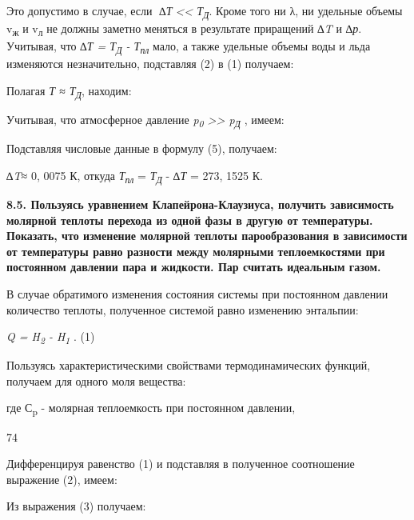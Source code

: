 Это допустимо в случае, если \emph{∆Т\textless\textless{}
Т\textsubscript{Д}}. Кроме того ни λ, ни удельные объемы
v\textsubscript{ж} и v\textsubscript{л} не должны заметно меняться в
результате приращений \emph{∆T} и \emph{∆р}. Учитывая, что \emph{∆Т =
Т\textsubscript{Д} - Т\textsubscript{пл}} мало, а также удельные объемы
воды и льда изменяются незначительно, подставляя (2) в (1) получаем:

Полагая \emph{Т ≈ Т\textsubscript{Д}}, находим:


Учитывая, что атмосферное давление \emph{p\textsubscript{0}
\textgreater\textgreater{} p\textsubscript{Д}} , имеем:


Подставляя числовые данные в формулу (5), получаем:

\emph{∆T}≈ 0, 0075 К, откуда \emph{Т\textsubscript{пл}} =
\emph{Т\textsubscript{Д}} - \emph{∆Т} = 273, 1525 К.

\textbf{8.5. Пользуясь уравнением Клапейрона-Клаузиуса, получить
зависимость молярной теплоты перехода из одной фазы в другую от
температуры. Показать, что изменение молярной теплоты парообразования в
зависимости} \textbf{от температуры равно разности между молярными
теплоемкостями при постоянном давлении пара и жидкости. Пар считать
идеальным газом.}

\solving{}

В случае обратимого изменения состояния системы при постоянном давлении
количество теплоты, полученное системой равно изменению энтальпии:

\emph{Q = H\textsubscript{2} - H\textsubscript{1}} . (1)

Пользуясь характеристическими свойствами термодинамических функций,
получаем для одного моля вещества:


где С\textsubscript{p} - молярная теплоемкость при постоянном давлении,

74

Дифференцируя равенство (1) и подставляя в полученное соотношение
выражение (2), имеем:


Из выражения (3) получаем:


